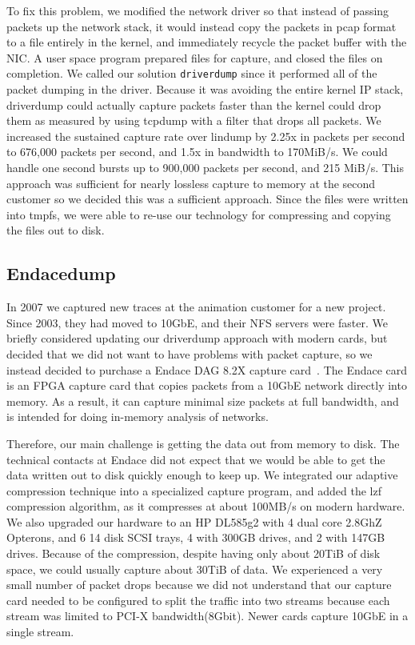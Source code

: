 To fix this problem, we modified the network driver so that instead of
passing packets up the network stack, it would instead copy the
packets in pcap format to a file entirely in the kernel, and
immediately recycle the packet buffer with the NIC.  A user space
program prepared files for capture, and closed the files on
completion.  We called our solution {\tt driverdump} since it
performed all of the packet dumping in the driver.  Because it was
avoiding the entire kernel IP stack, driverdump could actually capture
packets faster than the kernel could drop them as measured by using
tcpdump with a filter that drops all packets.  We increased the
sustained capture rate over lindump by 2.25x in packets per second to
676,000 packets per second, and 1.5x in bandwidth to 170MiB/s.  We
could handle one second bursts up to 900,000 packets per second, and
215 MiB/s.  This approach was sufficient for nearly lossless capture
to memory at the second customer so we decided this was a sufficient
approach.  Since the files were written into tmpfs, we were able to
re-use our technology for compressing and copying the files out to
disk.

\subsection{Endacedump}

In 2007 we captured new traces at the animation customer for a new
project.  Since 2003, they had moved to 10GbE, and their NFS servers
were faster. We briefly considered updating our driverdump approach
with modern cards, but decided that we did not want to have problems
with packet capture, so we instead decided to purchase a Endace DAG
8.2X capture card~\cite{endace-cards}.  The Endace card is an FPGA
capture card that copies packets from a 10GbE network directly into
memory.  As a result, it can capture minimal size packets at full
bandwidth, and is intended for doing in-memory analysis of networks.

Therefore, our main challenge is getting the data out from memory to
disk.  The technical contacts at Endace did not expect that we would
be able to get the data written out to disk quickly enough to keep up.
We integrated our adaptive compression technique into a specialized
capture program, and added the lzf~\cite{lzf} compression algorithm,
as it compresses at about 100MB/s on modern hardware.  We also
upgraded our hardware to an HP DL585g2 with 4 dual core 2.8GhZ
Opterons, and 6 14 disk SCSI trays, 4 with 300GB drives, and 2 with
147GB drives.  Because of the compression, despite having only about
20TiB of disk space, we could usually capture about 30TiB of data.
We experienced a very small number of packet drops because we did not
understand that our capture card needed to be configured to split the
traffic into two streams because each stream was limited to PCI-X
bandwidth(8Gbit).  Newer cards capture 10GbE in a single stream.

